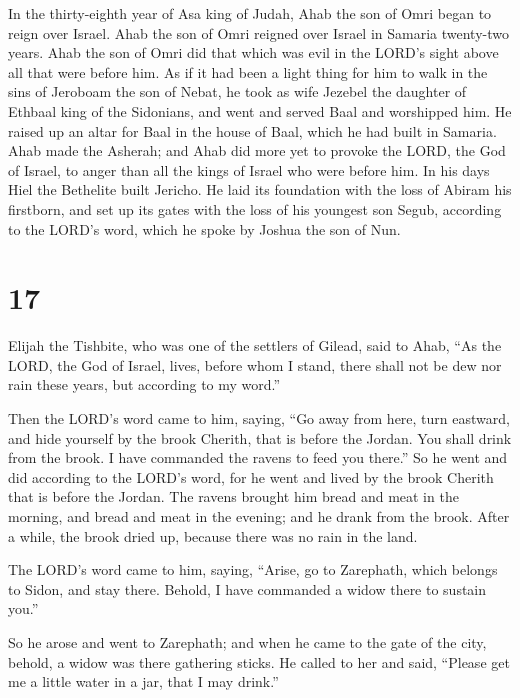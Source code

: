  In the thirty-eighth year of Asa king of Judah, Ahab the
son of Omri began to reign over Israel. Ahab the son of Omri reigned
over Israel in Samaria twenty-two years.  Ahab the son of
Omri did that which was evil in the LORD's sight above all that were
before him.  As if it had been a light thing for him to
walk in the sins of Jeroboam the son of Nebat, he took as wife Jezebel
the daughter of Ethbaal king of the Sidonians, and went and served Baal
and worshipped him.  He raised up an altar for Baal in
the house of Baal, which he had built in Samaria.  Ahab
made the Asherah; and Ahab did more yet to provoke the LORD, the God of
Israel, to anger than all the kings of Israel who were before him.
 In his days Hiel the Bethelite built Jericho. He laid
its foundation with the loss of Abiram his firstborn, and set up its
gates with the loss of his youngest son Segub, according to the LORD's
word, which he spoke by Joshua the son of Nun.

\hypertarget{section-16}{%
\section{17}\label{section-16}}

 Elijah the Tishbite, who was one of the settlers of
Gilead, said to Ahab, ``As the LORD, the God of Israel, lives, before
whom I stand, there shall not be dew nor rain these years, but according
to my word.''

 Then the LORD's word came to him, saying, 
``Go away from here, turn eastward, and hide yourself by the brook
Cherith, that is before the Jordan.  You shall drink from
the brook. I have commanded the ravens to feed you there.''
 So he went and did according to the LORD's word, for he
went and lived by the brook Cherith that is before the Jordan.
 The ravens brought him bread and meat in the morning, and
bread and meat in the evening; and he drank from the brook.
 After a while, the brook dried up, because there was no
rain in the land.

 The LORD's word came to him, saying, 
``Arise, go to Zarephath, which belongs to Sidon, and stay there.
Behold, I have commanded a widow there to sustain you.''

 So he arose and went to Zarephath; and when he came to
the gate of the city, behold, a widow was there gathering sticks. He
called to her and said, ``Please get me a little water in a jar, that I
may drink.''

